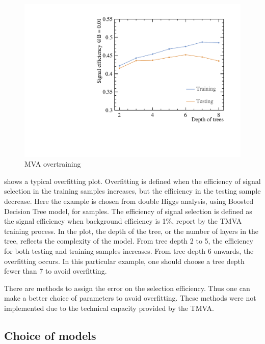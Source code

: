 \begin{figure}[!tbp]
\includegraphics[width=\largefigwidth]{doubleHiggs/DepthOfTrees}
\caption[MVA overtraining]%
   {MVA overtraining}
   \label{fig:analysisMVAovertraining}
\end{figure}

 shows a typical overfitting plot. Overfitting is defined when the efficiency of signal selection in the training samples increases, but the efficiency in the testing sample decrease. Here the example is chosen from double Higgs analysis, using Boosted Decision Tree model, for  samples. The efficiency of signal selection is defined as the signal efficiency when background efficiency is 1\%, report by the TMVA training process. In the plot, the depth of the tree, or the number of layers in the tree, reflects the complexity of the model. From tree depth 2 to 5, the efficiency for both testing and training samples increases. From tree depth 6 onwards, the overfitting occurs. In this particular example, one should choose a tree depth fewer than 7 to avoid overfitting.

There are methods to assign the error on the selection efficiency. Thus one can make a better choice of parameters to avoid overfitting. These methods were not implemented due to the technical capacity provided by the TMVA.

\subsection{Choice of models}

